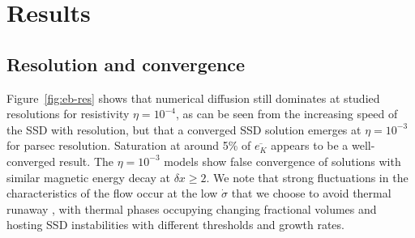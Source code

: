 \documentclass[preprint2]{aastex63}
\newcommand\dx{ {\delta x}}
\newcommand\BKM{{\sf BKMM4}}
\begin{document}

\section{Results} \label{sec:results}

\subsection{{Resolution and convergence}} \label{sec:conv}
{Figure~\ref{fig:eb-res} shows
 that numerical diffusion still dominates at studied
 resolutions for resistivity  $\eta = 10^{-4}$, as can be seen from the
 increasing speed of the SSD with resolution, but that a converged SSD solution
 emerges at  $\eta = 10^{-3}$ for parsec resolution.}
 Saturation at around 5\% of $\overline{e_K}$ appears to be a well-converged
 result.
 {The $\eta = 10^{-3}$ models show} false convergence
 \citep{FMA91} of solutions with similar magnetic energy decay at $\dx\geq2$.
 {We note that strong fluctuations in the characteristics of the flow
 {occur at the} low $\dot\sigma$ {that we choose to avoid thermal runaway
 \citep{LOCBN15},} with thermal phases occupying changing fractional volumes
 \citep[e.g.][]{gatto2015} and hosting SSD instabilities with different 
 thresholds and growth rates.
 }
\end{document}
